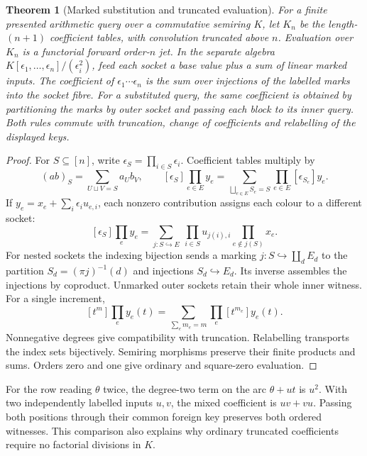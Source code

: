 \documentclass[11pt,a4paper]{article}
\newtheorem{theorem}{Theorem}[section]
\theoremstyle{definition}
\theoremstyle{remark}\newaliascnt{remark}{theorem}
\numberwithin{equation}{section}
\begin{document}
\begin{theorem}[Marked substitution and truncated evaluation]\label{thm:marked-jets}
For a finite presented arithmetic query over a commutative semiring $K$, let $K_n$ be the length-$(n+1)$ coefficient tables, with convolution truncated above $n$. Evaluation over $K_n$ is a functorial forward order-$n$ jet. In the separate algebra $K[\epsilon_1,\ldots,\epsilon_n]/(\epsilon_i^2)$, feed each socket a base value plus a sum of linear marked inputs. The coefficient of $\epsilon_1\cdots\epsilon_n$ is the sum over injections of the labelled marks into the socket fibre. For a substituted query, the same coefficient is obtained by partitioning the marks by outer socket and passing each block to its inner query. Both rules commute with truncation, change of coefficients and relabelling of the displayed keys.
\end{theorem}
\begin{proof}
For \(S\subseteq[n]\), write \(\epsilon_S=\prod_{i\in S}\epsilon_i\). Coefficient tables multiply by
\[
 (ab)_S=\sum_{U\sqcup V=S}a_Ub_V,\qquad
 [\epsilon_S]\prod_{e\in E}y_e
     =\sum_{\bigsqcup_{e\in E}S_e=S}\prod_{e\in E}[\epsilon_{S_e}]y_e .
\]
If \(y_e=x_e+\sum_i\epsilon_i u_{e,i}\), each nonzero contribution assigns each colour to a different socket:
\[
 [\epsilon_S]\prod_e y_e
 =\sum_{j:S\hookrightarrow E}\ \prod_{i\in S}u_{j(i),i}
                         \prod_{e\notin j(S)}x_e .
\]
For nested sockets the indexing bijection sends a marking \(j:S\hookrightarrow\coprod_d E_d\) to the partition \(S_d=(\pi j)^{-1}(d)\) and injections \(S_d\hookrightarrow E_d\). Its inverse assembles the injections by coproduct. Unmarked outer sockets retain their whole inner witness. For a single increment,
\[
 [t^m]\prod_e y_e(t)=\sum_{\sum_e m_e=m}\prod_e[t^{m_e}]y_e(t).
\]
Nonnegative degrees give compatibility with truncation. Relabelling transports the index sets bijectively. Semiring morphisms preserve their finite products and sums. Orders zero and one give ordinary and square-zero evaluation.
\end{proof}
For the row reading $\theta$ twice, the degree-two term on the arc $\theta+ut$ is $u^2$. With two independently labelled inputs $u,v$, the mixed coefficient is $uv+vu$. Passing both positions through their common foreign key preserves both ordered witnesses. This comparison also explains why ordinary truncated coefficients require no factorial divisions in $K$.
\end{document}
